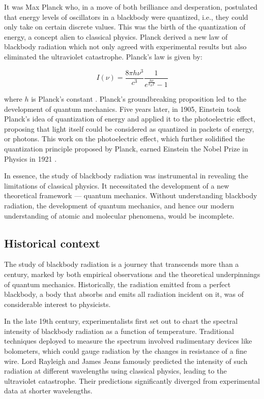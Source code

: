 \documentclass[10pt,letterpaper,onecolumn]{article}
\begin{document}
It was Max Planck who, in a move of both brilliance and desperation, 
postulated that energy levels of oscillators in a blackbody were quantized, 
i.e., they could only take on certain discrete values. This was the birth 
of the quantization of energy, a concept alien to classical physics. 
Planck derived a new law of blackbody radiation which not only agreed 
with experimental results but also eliminated the ultraviolet catastrophe. 
Planck's law is given by:

\begin{equation}
I(\nu) = \frac{8 \pi h \nu^3}{c^3} \frac{1}{e^{\frac{h \nu}{k_B T}} - 1}
\end{equation}

where \( h \) is Planck's constant \cite{planck1901}.
Planck's groundbreaking proposition led to the development of 
quantum mechanics. Five years later, in 1905, Einstein took Planck's 
idea of quantization of energy and applied it to the photoelectric effect, 
proposing that light itself could be considered as quantized in packets of 
energy, or photons. This work on the photoelectric effect, which further 
solidified the quantization principle proposed by Planck, earned Einstein 
the Nobel Prize in Physics in 1921 \cite{einstein1905}.

In essence, the study of blackbody radiation was instrumental in revealing the limitations of classical physics. It necessitated the development of a new theoretical framework — quantum mechanics. Without understanding blackbody radiation, the development of quantum mechanics, and hence our modern understanding of atomic and molecular phenomena, would be incomplete.


\subsection{Historical context}

The study of blackbody radiation is a journey that transcends 
more than a century, marked by both empirical observations and 
the theoretical underpinnings of quantum mechanics. Historically, 
the radiation emitted from a perfect blackbody, a body that absorbs 
and emits all radiation incident on it, was of considerable interest 
to physicists.

In the late 19th century, experimentalists first set out to chart the 
spectral intensity of blackbody radiation as a function of temperature. 
Traditional techniques deployed to measure the spectrum involved rudimentary 
devices like bolometers, which could gauge radiation by the changes in 
resistance of a fine wire. Lord Rayleigh and James Jeans famously predicted 
the intensity of such radiation at different wavelengths using classical 
physics, leading to the ultraviolet catastrophe. Their predictions 
significantly diverged from experimental data at shorter wavelengths.
\end{document}
